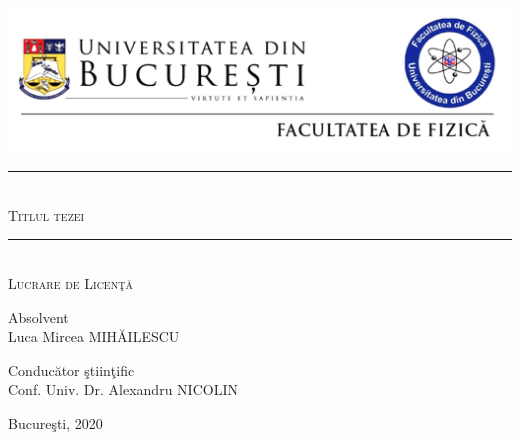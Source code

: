 \documentclass[12pt,openright,twoside]{book}
\newcommand{\HRule}{\rule{\linewidth}{0.4mm}}
\begin{document}
\begin{titlepage}
\begin{center}





\includegraphics[width=16cm]{./antet_L.jpg}



\vspace{4cm}



    \HRule \\[0.3cm]


    {\Large \textsc {Titlul tezei}}\\


  \HRule \\[1.1cm]

  \textsc{\large Lucrare de Licen\c{t}\u{a}}\\[4cm]

   \begin{flushleft} \large
    {Absolvent} \\[0.1cm]
    Luca Mircea MIHĂILESCU
   \end{flushleft}

   \begin{flushright} \large
    {Conduc\u{a}tor \c{s}tiin\c{t}ific} \\[0.1cm]
    Conf. Univ. Dr. Alexandru NICOLIN
   \end{flushright}


  \vfill


 {\large Bucure\c{s}ti, 2020}

\end{center}

\end{titlepage}
\newpage
\vspace*{\fill}
\thispagestyle{empty}




\newpage
\thispagestyle{plain} 


\vspace*{36pt}
\end{document}
